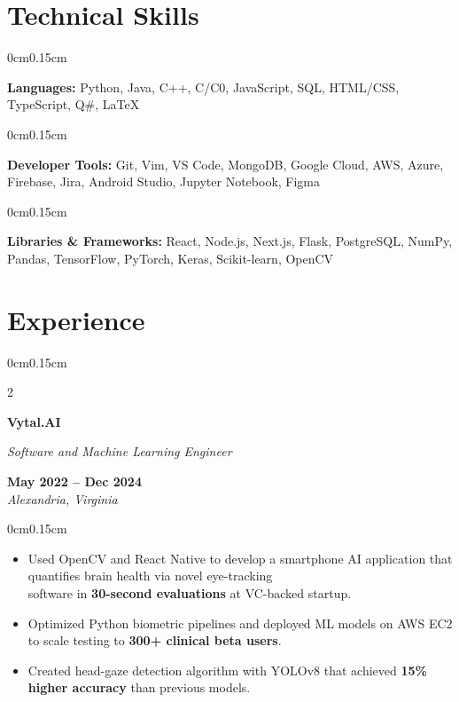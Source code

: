 \documentclass[10pt, letterpaper]{article}
\newenvironment{highlights}{
    \begin{itemize}[topsep=0pt, parsep=0pt, partopsep=0pt, itemsep=0pt, leftmargin=0.6cm]
}{
    \end{itemize}
}
\newenvironment{onecolentry}{
    \begin{adjustwidth}{0cm}{0.15cm}
}{
    \end{adjustwidth}
}
\newenvironment{twocolentry}[2][]{
    \onecolentry
    \def\secondColumn{#2}
    \setcolumnwidth{\fill, 4cm}
    \begin{paracol}{2}
}{
    \switchcolumn \raggedleft \secondColumn
    \end{paracol}
    \endonecolentry
}
\begin{document}
    \vspace{0.05cm}

    \section{Technical Skills}
    \vspace{0.1cm}

    \begin{onecolentry}
        \textbf{Languages:} Python, Java, C++, C/C0, JavaScript, SQL, HTML/CSS, TypeScript, Q\#, LaTeX
    \end{onecolentry}
    \vspace{-0.1cm}
    \begin{onecolentry}
        \textbf{Developer Tools:} Git, Vim, VS Code, MongoDB, Google Cloud, AWS, Azure, Firebase, Jira, Android Studio, Jupyter Notebook, Figma
    \end{onecolentry}
    \vspace{-0.1cm}
    \begin{onecolentry}
        \textbf{Libraries \& Frameworks:} React, Node.js, Next.js, Flask, PostgreSQL, NumPy, Pandas, TensorFlow, PyTorch, Keras, Scikit-learn, OpenCV
    \end{onecolentry}

    \vspace{0.05cm}

    \section{Experience}
    \vspace{0.1cm}

    \begin{twocolentry}{\textbf{May 2022 -- Dec 2024} \\ \textit{Alexandria, Virginia}}
        \textbf{Vytal.AI}
        
        \textit{Software and Machine Learning Engineer}
    \end{twocolentry}
    \vspace{-0.15cm}
    \begin{onecolentry}
        \begin{highlights}
            \item Used OpenCV and React Native to develop a smartphone AI application that quantifies brain health via novel eye-tracking \\ software in \textbf{30-second evaluations} at VC-backed startup.
            \item Optimized Python biometric pipelines and deployed ML models on AWS EC2 to scale testing to \textbf{300+ clinical beta users}.
            \item Created head-gaze detection algorithm with YOLOv8 that achieved \textbf{15\% higher accuracy} than previous models.
        \end{highlights}
    \end{onecolentry}
\end{document}
